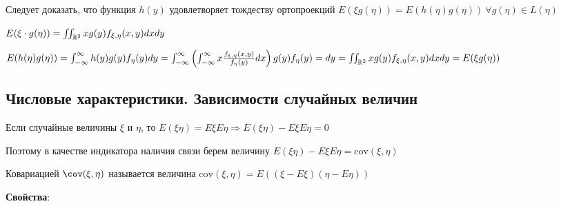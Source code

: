 \documentclass[12pt]{article}
\begin{document}
Следует доказать, что функция $h(y)$ удовлетворяет тождеству ортопроекций $E(\xi g(\eta)) = E(h(\eta)g(\eta)) \ \forall g(\eta) \in L(\eta)$

$E(\xi\cdot g(\eta)) = \iint_{\mathbb{R}^2} xg(y) f_{\xi,\eta}(x, y)dxdy$

$E(h(\eta)g(\eta)) = \int_{-\infty}^{\infty} h(y) g(y) f_{\eta}(y) dy = \int_{-\infty}^\infty \left(\int_{-\infty}^\infty x\frac{f_{\xi,\eta}(x, y)}{f_\eta(y)}dx\right) g(y) f_\eta(y) = dy = \iint_{\mathbb{R}^2} xg(y)f_{\xi,\eta}(x, y)dxdy = E(\xi g(\eta))$

\subsection{Числовые характеристики. Зависимости случайных величин}

\Mem Если случайные величины $\xi$ и $\eta$, то $E(\xi\eta) = E\xi E\eta \Longrightarrow E(\xi\eta) - E\xi E\eta = 0$

Поэтому в качестве индикатора наличия связи берем величину $E(\xi\eta) - E\xi E\eta = \mathrm{cov}(\xi, \eta)$

\hypertarget{covariance}{}

\Def Ковариацией $\mathrm{\cov}(\xi, \eta)$ называется величина $\mathrm{cov}(\xi, \eta) = E((\xi - E\xi)(\eta - E\eta))$

\mediumvspace

\textbf{Свойства}:
\end{document}

